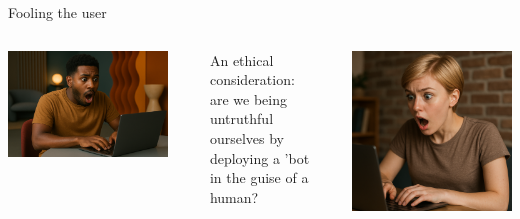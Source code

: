 \documentclass[12pt]{beamer}
\begin{document}
\begin{frame}[c]{Fooling the user}

\begin{columns}[c,onlytextwidth]
  \begin{column}{0.25\textwidth}
    \centering
    \includegraphics[width=\linewidth]{surprised1.png}
  \end{column}

  \begin{column}{0.03\textwidth}\hfill\end{column}
  \begin{column}{0.5\textwidth}
An ethical consideration: are we being untruthful ourselves by deploying a 'bot in the guise of a human?
  \end{column}

  \begin{column}{0.03\textwidth}\hfill\end{column}
  \begin{column}{0.2\textwidth}
    \centering
    \includegraphics[width=\linewidth]{surprised2.png}
  \end{column}
\end{columns}


\end{frame}
\end{document}
